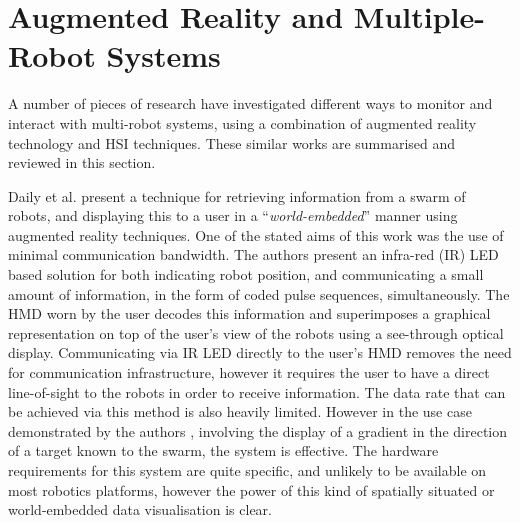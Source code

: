 \section{Augmented Reality and Multiple-Robot Systems} \label{SimilarWork}
A number of pieces of research have investigated different ways to monitor and interact with multi-robot systems, using a combination of augmented reality technology and HSI techniques. These similar works are summarised and reviewed in this section.

Daily et al. \cite{Daily:2003} present a technique for retrieving information from a swarm of robots, and displaying this to a user in a ``\textit{world-embedded}'' manner using augmented reality techniques. One of the stated aims of this work was the use of minimal communication bandwidth. The authors present \cite{Daily:2003} an infra-red (IR) LED based solution for both indicating robot position, and communicating a small amount of information, in the form of coded pulse sequences, simultaneously. The HMD worn by the user decodes this information and superimposes a graphical representation on top of the user's view of the robots using a see-through optical display. Communicating via IR LED directly to the user's HMD removes the need for communication infrastructure, however it requires the user to have a direct line-of-sight to the robots in order to receive information. The data rate that can be achieved via this method is also heavily limited. However in the use case demonstrated by the authors \cite{Daily:2003}, involving the display of a gradient in the direction of a target known to the swarm, the system is effective. The hardware requirements for this system are quite specific, and unlikely to be available on most robotics platforms, however the power of this kind of spatially situated or world-embedded data visualisation is clear.


